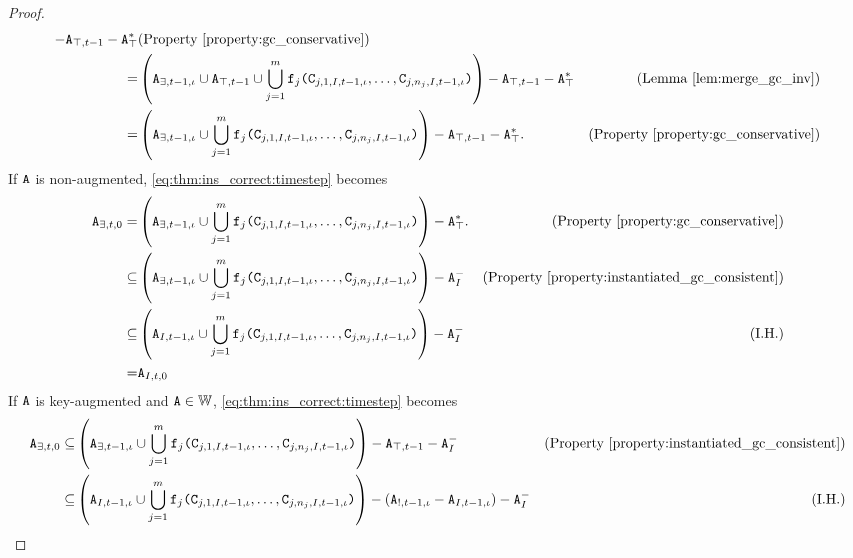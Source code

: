 \begin{proof}
\begin{align}
- \tt{A}_{\top,t-1} - \tt{A}_\top^* & \text{(Property \ref{property:gc_conservative})}\nonumber\\
=& \left(\tt{A}_{\exists,t-1,\iota} \cup \tt{A}_{\top,t-1} \cup \bigcup_{j=1}^m \tt{f}_j\tt{(}\tt{C}_{j,1,I,t-1,\iota}, \dots, \tt{C}_{j,n_j,I,t-1,\iota}\tt{)}\right)
- \tt{A}_{\top,t-1} - \tt{A}_\top^* & \text{(Lemma \ref{lem:merge_gc_inv})}\nonumber\\
=& \left(\tt{A}_{\exists,t-1,\iota} \cup \bigcup_{j=1}^m \tt{f}_j\tt{(}\tt{C}_{j,1,I,t-1,\iota}, \dots, \tt{C}_{j,n_j,I,t-1,\iota}\tt{)}\right)
- \tt{A}_{\top,t-1} - \tt{A}_\top^*. & \text{(Property \ref{property:gc_conservative})} \label{eq:thm:ins_correct:timestep}
\end{align}
If $\tt{A}$ is non-augmented, \eqref{eq:thm:ins_correct:timestep} becomes
\begin{align}
\tt{A}_{\exists,t,0}
=& \left(\tt{A}_{\exists,t-1,\iota} \cup \bigcup_{j=1}^m \tt{f}_j\tt{(}\tt{C}_{j,1,I,t-1,\iota}, \dots, \tt{C}_{j,n_j,I,t-1,\iota}\tt{)}\right)
- \tt{A}_\top^*. & \text{(Property \ref{property:gc_conservative})}\nonumber\\
\subseteq& \left(\tt{A}_{\exists,t-1,\iota} \cup \bigcup_{j=1}^m \tt{f}_j\tt{(}\tt{C}_{j,1,I,t-1,\iota}, \dots, \tt{C}_{j,n_j,I,t-1,\iota}\tt{)}\right)
- \tt{A}_I^- & \text{(Property \ref{property:instantiated_gc_consistent})} \nonumber\\%
\subseteq& \left(\tt{A}_{I,t-1,\iota} \cup \bigcup_{j=1}^m \tt{f}_j\tt{(}\tt{C}_{j,1,I,t-1,\iota}, \dots, \tt{C}_{j,n_j,I,t-1,\iota}\tt{)}\right)
- \tt{A}_I^- & \text{(I.H.)} \nonumber\\%
=& \tt{A}_{I,t,0} \nonumber
\end{align}
If $\tt{A}$ is key-augmented and $\tt{A} \in \mathbb{W}$, \eqref{eq:thm:ins_correct:timestep} becomes
\begin{align*}
\tt{A}_{\exists,t,0}
\subseteq& \left(\tt{A}_{\exists,t-1,\iota} \cup \bigcup_{j=1}^m \tt{f}_j\tt{(}\tt{C}_{j,1,I,t-1,\iota}, \dots, \tt{C}_{j,n_j,I,t-1,\iota}\tt{)}\right)
- \tt{A}_{\top,t-1} - \tt{A}_I^- & \text{(Property \ref{property:instantiated_gc_consistent})} 
\\
\subseteq& \left(\tt{A}_{I,t-1,\iota} \cup \bigcup_{j=1}^m \tt{f}_j\tt{(}\tt{C}_{j,1,I,t-1,\iota}, \dots, \tt{C}_{j,n_j,I,t-1,\iota}\tt{)}\right)
-(\tt{A}_{!,t-1,\iota} - \tt{A}_{I,t-1,\iota}) - \tt{A}_I^- & \text{(I.H.)}\\

\end{align*}
\end{proof}
